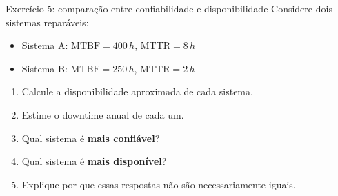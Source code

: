 \documentclass{beamer}
\newif\ifshowsolutions
\newcommand{\A}{\mathrm{A}}
\newcommand{\MTBF}{\mathrm{MTBF}}
\newcommand{\MTTR}{\mathrm{MTTR}}
\begin{document}
\begin{frame}{Exercício 5: comparação entre confiabilidade e disponibilidade}
Considere dois sistemas reparáveis:

\begin{itemize}
  \item Sistema A: \(\MTBF=400\,h\), \(\MTTR=8\,h\)
  \item Sistema B: \(\MTBF=250\,h\), \(\MTTR=2\,h\)
\end{itemize}

\begin{enumerate}
  \item Calcule a disponibilidade aproximada de cada sistema.
  \item Estime o downtime anual de cada um.
  \item Qual sistema é \textbf{mais confiável}?
  \item Qual sistema é \textbf{mais disponível}?
  \item Explique por que essas respostas não são necessariamente iguais.
\end{enumerate}
\end{frame}

\ifshowsolutions
\begin{frame}{Gabarito Exercício 5}
\small
\begin{itemize}
  \item Sistema A:
  \[
  \A_A=\frac{400}{400+8}=\frac{400}{408}\approx 0.98039
  \]
  \[
  \text{downtime/ano}=(1-0.98039)\times 8760 \approx 171.8\,h/ano
  \]

  \item Sistema B:
  \[
  \A_B=\frac{250}{250+2}=\frac{250}{252}\approx 0.99206
  \]
  \[
  \text{downtime/ano}=(1-0.99206)\times 8760 \approx 69.5\,h/ano
  \]

  \item \textbf{Mais confiável}: Sistema A, pois possui maior \(\MTBF\) (falha menos frequentemente).
  \item \textbf{Mais disponível}: Sistema B, pois possui menor \(\MTTR\), compensando o \(\MTBF\) menor.
\end{itemize}

\begin{block}{Conclusão}
Confiabilidade e disponibilidade estão relacionadas, mas não são a mesma coisa:
um sistema pode falhar mais vezes e ainda assim ficar menos tempo indisponível.
\end{block}
\end{frame}
\fi
\end{document}
